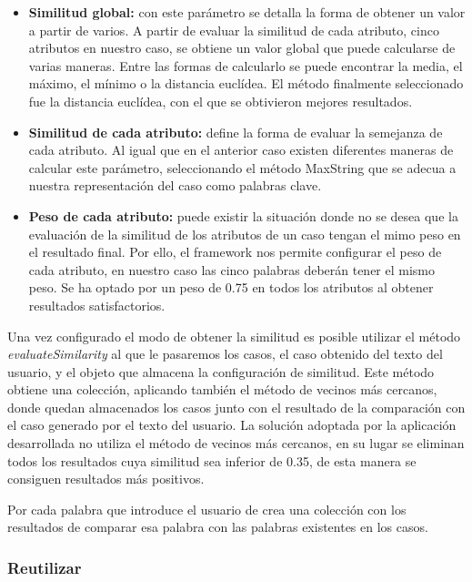 \begin{itemize}
\tightlist
\item
  \textbf{Similitud global:} con este parámetro se detalla la forma de obtener un valor a partir de varios. A partir de evaluar la similitud de cada atributo, cinco atributos en nuestro caso, se obtiene un valor global que puede calcularse de varias maneras. Entre las formas de calcularlo se puede encontrar la media, el máximo, el mínimo o la distancia euclídea. El método finalmente seleccionado fue la distancia euclídea, con el que se obtivieron mejores resultados.
\item
  \textbf{Similitud de cada atributo:} define la forma de evaluar la semejanza de cada atributo. Al igual que en el anterior caso existen diferentes maneras de calcular este parámetro, seleccionando el método MaxString que se adecua a nuestra representación del caso como palabras clave.
\item
  \textbf{Peso de cada atributo:} puede existir la situación donde no se desea que la evaluación de la similitud de los atributos de un caso tengan el mimo peso en el resultado final. Por ello, el framework nos permite configurar el peso de cada atributo, en nuestro caso las cinco palabras deberán tener el mismo peso. Se ha optado por un peso de 0.75 en todos los atributos al obtener resultados satisfactorios.
\end{itemize}

Una vez configurado el modo de obtener la similitud es posible utilizar el método \emph{evaluateSimilarity} al que le pasaremos los casos, el caso obtenido del texto del usuario, y el objeto que almacena la configuración de similitud. Este método obtiene una colección, aplicando también el método de vecinos más cercanos, donde quedan almacenados los casos junto con el resultado de la comparación con el caso generado por el texto del usuario. La solución adoptada por la aplicación desarrollada no utiliza el método de vecinos más cercanos, en su lugar se eliminan todos los resultados cuya similitud sea inferior de 0.35, de esta manera se consiguen resultados más positivos.

Por cada palabra que introduce el usuario de crea una colección con los resultados de comparar esa palabra con las palabras existentes en los casos.

\subsubsection{Reutilizar}\label{reutilizar}

